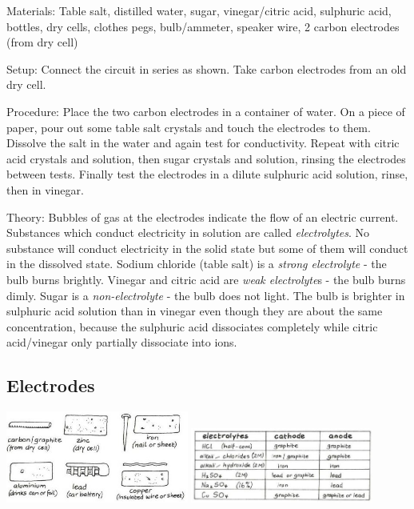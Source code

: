 \begin{multicols}{2}
\begin{description*}
\item[Materials:]{Table salt, distilled water, sugar, vinegar/citric acid, sulphuric acid, bottles, dry cells, clothes pegs, bulb/ammeter, speaker wire, 2 carbon electrodes (from dry cell)}
\item[Setup:]{Connect the circuit in series as shown. Take carbon electrodes from an old dry cell.}
\item[Procedure:]{Place the two carbon electrodes in a container of water. On a piece of paper, pour out some table salt crystals and touch the electrodes to them. Dissolve the salt in the water and again test for conductivity. Repeat with citric acid crystals and solution, then sugar crystals and solution, rinsing the electrodes between tests. Finally test the electrodes in a dilute sulphuric acid solution, rinse, then in vinegar.}
\item[Theory:]{Bubbles of gas at the electrodes indicate the
flow of an electric current. Substances which
conduct electricity in solution are called \emph{electrolytes}. No substance will conduct electricity in the solid state but some of them will
conduct in the dissolved state. Sodium chloride (table salt) is a \emph{strong electrolyte} - the bulb burns brightly. Vinegar and citric acid are \emph{weak electrolyte}s - the bulb burns dimly. Sugar is a \emph{non-electrolyte} - the bulb does not light. The bulb is brighter in sulphuric acid solution than in vinegar even though they are about the same concentration, because the sulphuric acid dissociates completely while citric acid/vinegar only partially dissociate into ions.}
\end{description*}

\subsection{Electrodes} 

\begin{center}
\includegraphics[width=0.45\textwidth]{./img/vso/electrodes.jpg}
\includegraphics[width=0.45\textwidth]{./img/vso/electrolyte-electrode.jpg}
\end{center}


\end{multicols}
